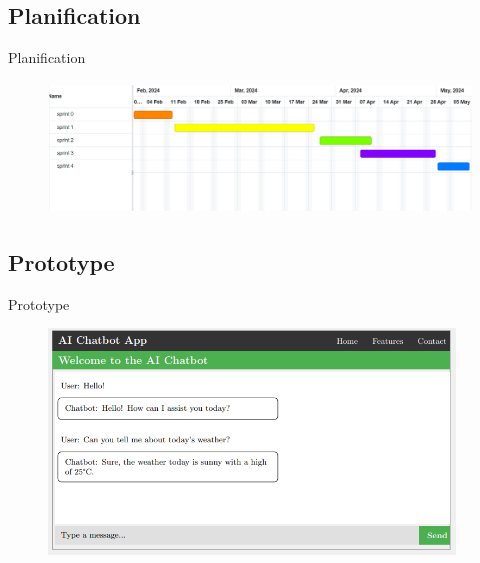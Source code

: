 \subsection{Planification}
\begin{frame}{Planification}

    \begin{figure}[htpb]
        \centering
        \includegraphics[height=3.5cm]{assets/images/gant-prev.png}
    \end{figure}
\end{frame}




\subsection{Prototype}
\begin{frame}{Prototype}

    \begin{figure}[htpb]
        \centering
        \includegraphics[height=6cm]{assets/images/prototype.png}
    \end{figure}

\end{frame}

